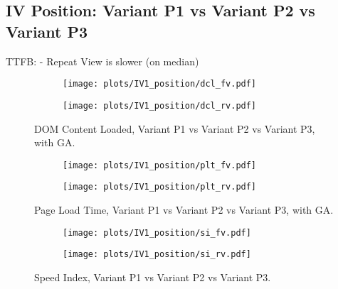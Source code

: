 
\subsection{IV Position: Variant P1 vs Variant P2 vs Variant P3}



TTFB:
- Repeat View is slower (on median)




\begin{figure}
	\centering
	\begin{subfigure}{.5\textwidth}
		\centering
		\texttt{[image: plots/IV1\_position/dcl\_fv.pdf]}
		\label{fig:sub1}
	\end{subfigure}%
	\begin{subfigure}{.5\textwidth}
		\centering
		\texttt{[image: plots/IV1\_position/dcl\_rv.pdf]}
		\label{fig:sub2}
	\end{subfigure}
	\caption{DOM Content Loaded, Variant P1 vs Variant P2 vs Variant P3, with GA.}
	\label{figure:plt_original_test}
\end{figure}



\begin{figure}
	\centering
	\begin{subfigure}{.5\textwidth}
		\centering
		\texttt{[image: plots/IV1\_position/plt\_fv.pdf]}
		\label{fig:sub1}
	\end{subfigure}%
	\begin{subfigure}{.5\textwidth}
		\centering
		\texttt{[image: plots/IV1\_position/plt\_rv.pdf]}
		\label{fig:sub2}
	\end{subfigure}
	\caption{Page Load Time, Variant P1 vs Variant P2 vs Variant P3, with GA.}
	\label{figure:plt_original_test}
\end{figure}


\begin{figure}
	\centering
	\begin{subfigure}{.5\textwidth}
		\centering
		\texttt{[image: plots/IV1\_position/si\_fv.pdf]}
		\label{fig:sub1}
	\end{subfigure}%
	\begin{subfigure}{.5\textwidth}
		\centering
		\texttt{[image: plots/IV1\_position/si\_rv.pdf]}
		\label{fig:sub2}
	\end{subfigure}
	\caption{Speed Index, Variant P1 vs Variant P2 vs Variant P3.}
	\label{figure:plt_original_test}
\end{figure}


